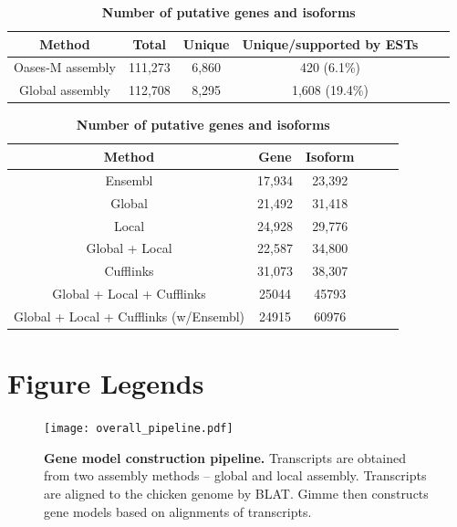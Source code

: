 \documentclass[10pt]{article}
\begin{document}
\begin{table}[!ht]
\caption{
\bf{Number of total and unique splice junctions}}
\begin{tabular}{cccccc}
\hline
Method& Total & Unique & Unique/supported by ESTs \\ 
\hline
Oases-M assembly & 111,273 & 6,860 & 420 (6.1\%) \\
Global assembly & 112,708 & 8,295 & 1,608 (19.4\%) \\
\hline
\end{tabular}
\label{Oases-M}

\caption{
\bf{Number of putative genes and isoforms}}
\begin{tabular}{cccccc}
\hline
Method& Gene & Isoform \\ 
\hline
Ensembl & 17,934 & 23,392 \\
Global & 21,492 & 31,418 \\
Local & 24,928 & 29,776 \\
Global + Local & 22,587 & 34,800 \\
Cufflinks & 31,073 & 38,307 \\
Global + Local + Cufflinks & 25044 & 45793 \\
Global + Local + Cufflinks (w/Ensembl) & 24915 & 60976 \\
\hline
\end{tabular}
\label{genes_transcripts}

\end{table}

\section*{Figure Legends}
\begin{figure}[!ht]
\begin{center}
\texttt{[image: overall\_pipeline.pdf]}
\end{center}
\caption{
{\bf Gene model construction pipeline.} Transcripts are obtained from two
assembly methods -- global and local assembly.  Transcripts are aligned to the
chicken genome by BLAT\@. Gimme then constructs gene models based on alignments
of transcripts.  }
\label{overall_pipeline}
\end{figure}
\end{document}
